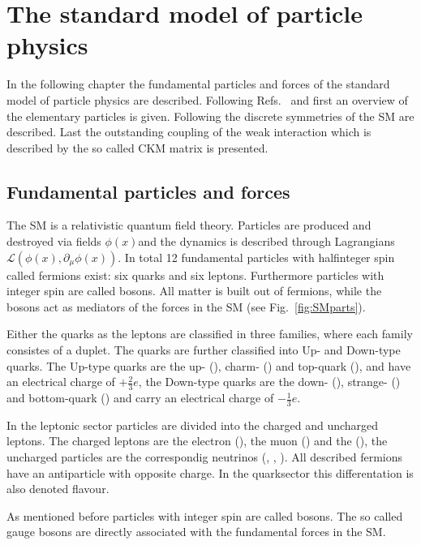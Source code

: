 \chapter{The standard model of particle physics}
\label{chap:SM}

In the following chapter the fundamental particles and forces of the standard model of particle physics are described.
Following Refs.~\cite{Griffiths:111880} and \cite{Peskin:257493} first an overview of the elementary particles is given. Following the
discrete symmetries of the \ac{SM} are described. Last the outstanding coupling of the weak interaction which is described
by the so called CKM matrix is presented.

\section{Fundamental particles and forces}
\label{sec:fundamentalparts}

The \ac{SM} is a relativistic quantum field theory. Particles are produced and destroyed via fields $\phi(x)$and the dynamics
is described through Lagrangians $\mathcal{L}\left(\phi(x),\partial_{\mu}\phi(x)\right)$. In total 12 fundamental particles
with halfinteger spin called fermions exist: six quarks and six leptons. Furthermore particles with integer spin are called
bosons. All matter is built out of fermions, while the bosons act as mediators of the forces in the \ac{SM} (see
Fig.~\cref{fig:SMparts}).

Either the quarks as the leptons are classified in three families, where each family consistes of a duplet. The quarks are further
classified into Up- and Down-type quarks. The Up-type quarks are the up- (\uquark), charm- (\cquark) and top-quark (\tquark),
and have an electrical charge of $+\frac{2}{3}e$, the Down-type quarks are the down- (\dquark), strange- (\squark) and bottom-quark
(\bquark) and carry an electrical charge of $-\frac{1}{3}e$.

In the leptonic sector particles are divided into the charged and uncharged leptons. The charged leptons are the electron (\electron),
the muon (\muon) and the \tauon (\tauon), the uncharged particles are the correspondig neutrinos (\neue, \neum, \neut). All described
fermions have an antiparticle with opposite charge. In the quarksector this differentation is also denoted  flavour.

As mentioned before particles with integer spin are called bosons. The so called gauge bosons are directly associated with the fundamental
forces in the \ac{SM}.

